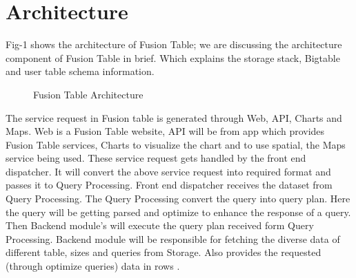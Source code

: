 \documentclass[9pt,twocolumn,twoside]{../../styles/osajnl}
\begin{document}
\section{Architecture}

Fig-1 shows the architecture of Fusion Table; we are discussing the architecture component of Fusion Table in brief. Which explains the storage stack, Bigtable and user table schema information. 
 

\begin{figure}[htbp]
	\centering
	\caption{Fusion Table Architecture }
	\label{fig:false-color}
\end{figure}

The service request in Fusion table is generated through Web, API, Charts and Maps. Web is a Fusion Table website, API will be from app which provides Fusion Table services, Charts to visualize the chart and to use spatial, the Maps service being used. These service request gets handled by the front end dispatcher. It will convert the above service request into required format and passes it to Query Processing. Front end dispatcher receives the dataset from Query Processing. The Query Processing convert the query into query plan. Here the query will be getting parsed and optimize to enhance the response of a query. Then Backend module’s will execute the query plan received form Query Processing. Backend module will be responsible for fetching the diverse data of different table, sizes and queries from Storage. Also provides the requested (through optimize queries) data in rows \cite{www-6}.
\end{document}
